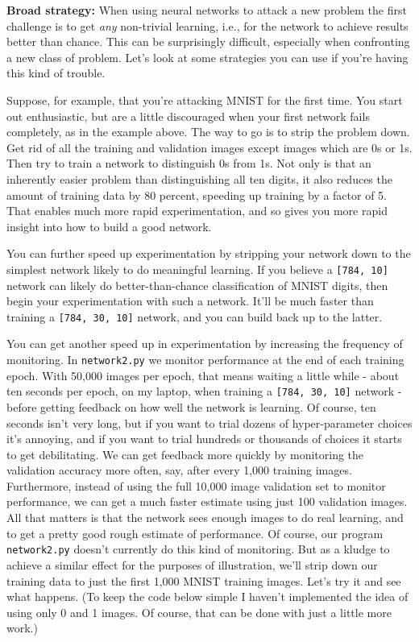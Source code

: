 \textbf{Broad strategy:} When using neural networks to attack a new problem the first challenge is to get \textit{any} non-trivial learning, i.e., for the network to achieve results better than chance. This can be surprisingly difficult, especially when confronting a new class of problem. Let's look at some strategies you can use if you're having this kind of trouble.

Suppose, for example, that you're attacking MNIST for the first time. You start out enthusiastic, but are a little discouraged when your first network fails completely, as in the example above. The way to go is to strip the problem down. Get rid of all the training and validation images except images which are 0s or 1s. Then try to train a network to distinguish 0s from 1s. Not only is that an inherently easier problem than distinguishing all ten digits, it also reduces the amount of training data by 80 percent, speeding up training by a factor of 5. That enables much more rapid experimentation, and so gives you more rapid insight into how to build a good network.

You can further speed up experimentation by stripping your network down to the simplest network likely to do meaningful learning. If you believe a \lstinline{[784, 10]} network can likely do better-than-chance classification of MNIST digits, then begin your experimentation with such a network. It'll be much faster than training a \lstinline{[784, 30, 10]} network, and you can build back up to the latter.

You can get another speed up in experimentation by increasing the frequency of monitoring. In \lstinline{network2.py} we monitor performance at the end of each training epoch. With 50,000 images per epoch, that means waiting a little while - about ten seconds per epoch, on my laptop, when training a \lstinline{[784, 30, 10]} network - before getting feedback on how well the network is learning. Of course, ten seconds isn't very long, but if you want to trial dozens of hyper-parameter choices it's annoying, and if you want to trial hundreds or thousands of choices it starts to get debilitating. We can get feedback more quickly by monitoring the validation accuracy more often, say, after every 1,000 training images. Furthermore, instead of using the full 10,000 image validation set to monitor performance, we can get a much faster estimate using just 100 validation images. All that matters is that the network sees enough images to do real learning, and to get a pretty good rough estimate of performance. Of course, our program \lstinline{network2.py} doesn't currently do this kind of monitoring. But as a kludge to achieve a similar effect for the purposes of illustration, we'll strip down our training data to just the first 1,000 MNIST training images. Let's try it and see what happens. (To keep the code below simple I haven't implemented the idea of using only 0 and 1 images. Of course, that can be done with just a little more work.)


